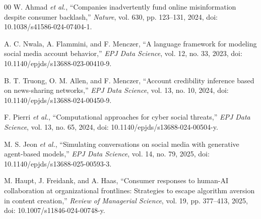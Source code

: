 \documentclass[conference]{IEEEtran}
\begin{document}
\begin{thebibliography}{00}
W. Ahmad \emph{et al.}, ``Companies inadvertently fund online misinformation despite consumer backlash,'' \emph{Nature}, vol. 630, pp. 123--131, 2024, doi: 10.1038/s41586-024-07404-1.

A. C. Nwala, A. Flammini, and F. Menczer, ``A language framework for modeling social media account behavior,'' \emph{EPJ Data Science}, vol. 12, no. 33, 2023, doi: 10.1140/epjds/s13688-023-00410-9.

B. T. Truong, O. M. Allen, and F. Menczer, ``Account credibility inference based on news-sharing networks,'' \emph{EPJ Data Science}, vol. 13, no. 10, 2024, doi: 10.1140/epjds/s13688-024-00450-9.

F. Pierri \emph{et al.}, ``Computational approaches for cyber social threats,'' \emph{EPJ Data Science}, vol. 13, no. 65, 2024, doi: 10.1140/epjds/s13688-024-00504-y.

M. S. Jeon \emph{et al.}, ``Simulating conversations on social media with generative agent-based models,'' \emph{EPJ Data Science}, vol. 14, no. 79, 2025, doi: 10.1140/epjds/s13688-025-00593-3.

M. Haupt, J. Freidank, and A. Haas, ``Consumer responses to human-AI collaboration at organizational frontlines: Strategies to escape algorithm aversion in content creation,'' \emph{Review of Managerial Science}, vol. 19, pp. 377--413, 2025, doi: 10.1007/s11846-024-00748-y.

\end{thebibliography}
\end{document}
